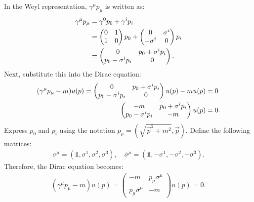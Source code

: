 \begin{enumerate}
    In the Weyl representation, $\gamma^\mu p_\mu$ is written as:
    \begin{align}
        \gamma^\mu p_\mu &= \gamma^0 p_0 + \gamma^i p_i \notag\\
        &= 
        \begin{pmatrix}
        0 & 1 \\
        1 & 0
        \end{pmatrix}
        p_0 + \begin{pmatrix}
        0 & \sigma^i \\
        -\sigma^i & 0
        \end{pmatrix}
        p_i\notag\\
        &= \begin{pmatrix}
            0 & p_0 + \sigma^i p_i \\
            p_0 - \sigma^i p_i & 0
            \end{pmatrix}.
    \end{align}
    Next, substitute this into the Dirac equation:
    \begin{align}
        (\gamma^\mu p_\mu - m)u(p) = 
        \begin{pmatrix}
        0 & p_0 + \sigma^i p_i \\
        p_0 - \sigma^i p_i & 0
        \end{pmatrix}
        u(p) - m u(p) &= 0\notag\\
        \begin{pmatrix}
        -m & p_0 + \sigma^i p_i \\
        p_0 - \sigma^i p_i & -m
        \end{pmatrix}
        u(p) &= 0.
    \end{align}
    Express $p_0$ and $p_i$ using the notation $p_\mu = (\sqrt{\vec{p}^2 + m^2}, \vec{p})$. Define the following matrices:
    \begin{align*}
        \sigma^\mu = (\mathds{1}, \sigma^1, \sigma^2, \sigma^3), \quad \bar{\sigma}^\mu = (\mathds{1}, -\sigma^1, -\sigma^2, -\sigma^3).
    \end{align*}
    Therefore, the Dirac equation becomes:
    \begin{align*}
        (\gamma^\mu p_\mu - m)u(p) = 
        \begin{pmatrix}
        -m & p_\mu \sigma^\mu \\
        p_\mu \bar{\sigma}^\mu & -m
        \end{pmatrix}
        u(p) = 0.
    \end{align*}

\end{enumerate}
